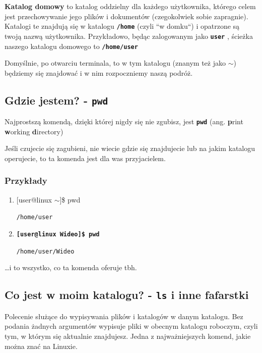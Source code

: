 \documentclass[12pt]{article}
\makeatletter
\newcommand{\ttbf}[1]{
    \texttt{\textbf{#1}}
}
\newenvironment{console1}
{
    \ttfamily
    \fontseries{b}
    \selectfont
    {[}user@linux $\sim${]}\$} {

    }
\makeatother
\begin{document}
\textbf{Katalog domowy} to katalog oddzielny dla każdego użytkownika, którego celem jest przechowywanie jego plików i dokumentów (czegokolwiek sobie zapragnie). Katalogi te znajdują się w katalogu \ttbf{/home} (czyli ``w domku``) i opatrzone są twoją nazwą użytkownika. Przykładowo, będąc zalogowanym jako \ttbf{user}, ścieżka naszego katalogu domowego to \ttbf{/home/user}

Domyślnie, po otwarciu terminala, to w tym katalogu (znanym też jako $\sim$) będziemy się znajdować i w nim rozpoczniemy naszą podróż.

\subsection{Gdzie jestem? - \ttbf{pwd}}

Najprostszą komendą, dzięki której nigdy się nie zgubisz, jest \ttbf{pwd} (ang. \textbf{p}rint \textbf{w}orking \textbf{d}irectory)

Jeśli czujecie się zagubieni, nie wiecie gdzie się znajdujecie lub na jakim katalogu operujecie, to ta komenda jest dla was przyjacielem.

\subsubsection{Przykłady}

\begin{enumerate}
    \item \begin{console1}
        pwd
    \end{console1}
    
    \texttt{/home/user}

    \item \ttbf{[user@linux Wideo]\$ pwd}

    \texttt{/home/user/Wideo}
\end{enumerate}

\dots i to wszystko, co ta komenda oferuje tbh.

\subsection{Co jest w moim katalogu? - \texttt{ls} i inne fafarstki}
\label{sec:ls}

Polecenie służące do wypisywania plików i katalogów w danym katalogu. Bez podania żadnych argumentów wypisuje pliki w obecnym katalogu roboczym, czyli tym, w którym się aktualnie znajdujesz. Jedna z najważniejszych komend, jakie można znać na Linuxie.
\end{document}

